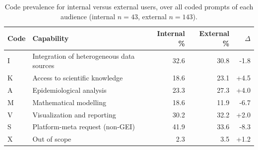 \begin{table}[htbp]
\centering
\caption{Code prevalence for internal versus external users, over all coded prompts of each audience (internal $n=43$, external $n=143$).}
\label{tab:s5-internal-external}
\begin{tabular}{llrrr}
\toprule
Code & Capability & Internal \% & External \% & $\Delta$ \\
\midrule
I & Integration of heterogeneous data sources & 32.6 & 30.8 & -1.8 \\
K & Access to scientific knowledge & 18.6 & 23.1 & +4.5 \\
A & Epidemiological analysis & 23.3 & 27.3 & +4.0 \\
M & Mathematical modelling & 18.6 & 11.9 & -6.7 \\
V & Visualization and reporting & 30.2 & 32.2 & +2.0 \\
S & Platform-meta request (non-GEI) & 41.9 & 33.6 & -8.3 \\
X & Out of scope & 2.3 & 3.5 & +1.2 \\
\bottomrule
\end{tabular}
\par{}
\end{table}
